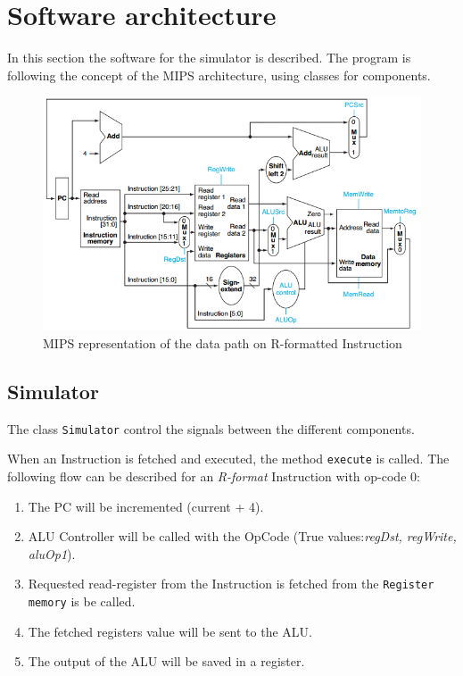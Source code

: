 \section{Software architecture}

In this section the software for the simulator is described. The
program is following the concept of the MIPS architecture, using
classes for components.

\begin{figure}[h]
    \centering
    \includegraphics[scale=0.6]{images/datapath-r-format}
    \caption{MIPS representation\cite{Patterson:2008:COD:1502247} of the data path on R-formatted Instruction}
    \label{fig:datapathBranchOnEqual}
\end{figure}

\subsection{Simulator}
The class \texttt{Simulator} control the signals between the different components.

When an Instruction is fetched and executed, the method
\texttt{execute} is called. The following flow can be described for an
\emph{R-format} Instruction with op-code 0:


\begin{enumerate}
\item The PC will be incremented (current + 4).
\item ALU Controller will be called with the OpCode (True values:\emph{regDst, regWrite, aluOp1}).
\item Requested read-register from the Instruction is fetched from the \texttt{Register memory} is be called.
\item The fetched registers value will be sent to the ALU.
\item The output of the ALU will be saved in a register.
\end{enumerate}

